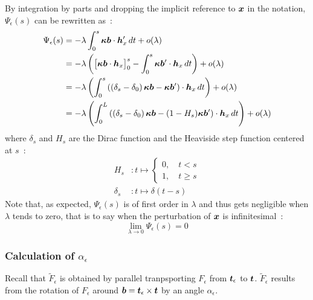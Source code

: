 By integration by parts and dropping the implicit reference to $\boldsymbol{x}$ in the notation, $\Psi_\epsilon(s)$ can be rewritten as~:
\begin{equation}
	\begin{aligned}
		\Psi_\epsilon(s)
		&= - \lambda \int_0^s \boldsymbol{\kappa b}\cdot\boldsymbol{h}'_x \,dt + o(\lambda)\\
		&=  - \lambda \left(\big[\boldsymbol{\kappa b} \cdot  \boldsymbol{h}_x \big]_0^s - \int_0^s \boldsymbol{\kappa b}' \cdot  \boldsymbol{h}_x \,dt\right) + o(\lambda)\\
		&= - \lambda \left(\int_0^s \left(\left(\delta_s-\delta_0\right)\boldsymbol{\kappa b} - \boldsymbol{\kappa b}'\right)\cdot  \boldsymbol{h}_x \,dt\right) + o(\lambda)\\
		&= - \lambda \left(\int_0^L \left(\left(\delta_s-\delta_0\right)\boldsymbol{\kappa b} - (1-H_s)\boldsymbol{\kappa b}'\right)\cdot  \boldsymbol{h}_x \,dt\right) + o(\lambda)
	\end{aligned}
\label{eq:psi}
\end{equation}
where $\delta_s$ and $H_s$ are the Dirac function and the Heaviside step function centered at $s$~:
\begin{subequations}
	\begin{alignat}{1}
		H_s &: t \mapsto \left\{\begin{array}{c}0  , \quad t<s \\1  , \quad t\geqslant s \end{array}\right.
		\\[1em]
		\delta_s &: t \mapsto \delta(t-s)
	\end{alignat}
\end{subequations}
Note that, as expected, $\Psi_\epsilon(s)$ is of first order in $\lambda$ and thus gets negligible when $\lambda$ tends to zero, that is to say when the perturbation of $\boldsymbol{x}$ is infinitesimal~:
\begin{equation}
	\lim_{\lambda \to 0} \Psi_\epsilon(s) = 0
	\label{eq:lim_psi}
\end{equation}



\subsubsection{Calculation of $\alpha_\epsilon$}

Recall that $\tilde{F}_\epsilon$ is obtained by parallel tranpsporting $F_\epsilon$ from $\boldsymbol{t}_\epsilon$ to $\boldsymbol{t}$.
$\tilde{F}_\epsilon$ results from the rotation of $F_\epsilon$ around $\boldsymbol{b} = \boldsymbol{t}_\epsilon \times \boldsymbol{t}$ by an angle $\alpha_\epsilon$.

